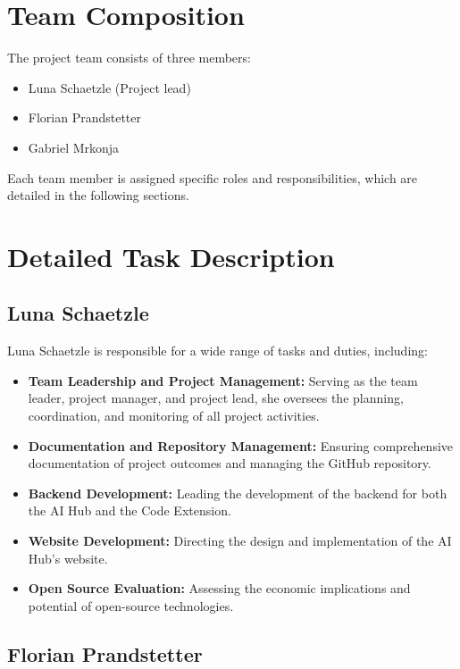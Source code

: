 \section{Team Composition}

The project team consists of three members:
\begin{itemize}
    \item Luna Schaetzle (Project lead)
    \item Florian Prandstetter
    \item Gabriel Mrkonja
\end{itemize}

Each team member is assigned specific roles and responsibilities, which are detailed in the following sections.

\section{Detailed Task Description}

\subsection{Luna Schaetzle}

Luna Schaetzle is responsible for a wide range of tasks and duties, including:
\begin{itemize}
    \item \textbf{Team Leadership and Project Management:} Serving as the team leader, project manager, and project lead, she oversees the planning, coordination, and monitoring of all project activities.
    \item \textbf{Documentation and Repository Management:} Ensuring comprehensive documentation of project outcomes and managing the GitHub repository.
    \item \textbf{Backend Development:} Leading the development of the backend for both the AI Hub and the Code Extension.
    \item \textbf{Website Development:} Directing the design and implementation of the AI Hub's website.
    \item \textbf{Open Source Evaluation:} Assessing the economic implications and potential of open-source technologies.
\end{itemize}

\subsection{Florian Prandstetter}

